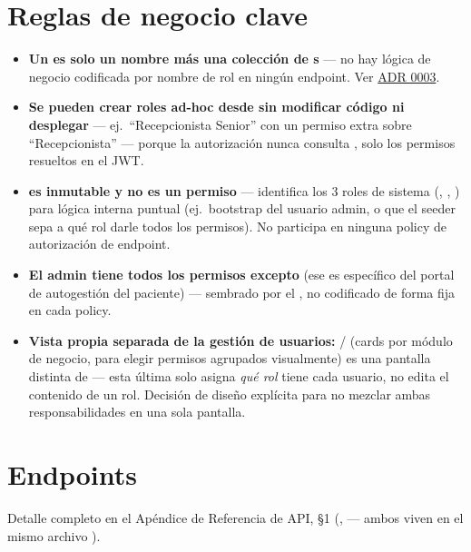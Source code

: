 \section{Reglas de negocio clave}
\label{sec:roles-reglas}

\begin{itemize}
  \item \textbf{Un  es solo un nombre más una colección de s} --- no hay lógica de negocio codificada por nombre de rol en ningún endpoint. Ver \hyperref[adr:0003]{ADR 0003}.
  \item \textbf{Se pueden crear roles ad-hoc desde  sin modificar código ni desplegar} --- ej.\ ``Recepcionista Senior'' con un permiso extra sobre ``Recepcionista'' --- porque la autorización nunca consulta , solo los permisos resueltos en el JWT.
  \item \textbf{ es inmutable y no es un permiso} --- identifica los 3 roles de sistema (, , ) para lógica interna puntual (ej.\ bootstrap del usuario admin, o que el seeder sepa a qué rol darle todos los permisos). No participa en ninguna policy de autorización de endpoint.
  \item \textbf{El admin tiene todos los permisos excepto } (ese es específico del portal de autogestión del paciente) --- sembrado por el , no codificado de forma fija en cada policy.
  \item \textbf{Vista propia separada de la gestión de usuarios:} / (cards por módulo de negocio, para elegir permisos agrupados visualmente) es una pantalla distinta de  --- esta última solo asigna \emph{qué rol} tiene cada usuario, no edita el contenido de un rol. Decisión de diseño explícita para no mezclar ambas responsabilidades en una sola pantalla.
\end{itemize}

\section{Endpoints}
\label{sec:roles-endpoints}

Detalle completo en el Apéndice de Referencia de API, \S 1 (, \allowbreak {}\allowbreak {} --- ambos viven en el mismo archivo \allowbreak {}).

